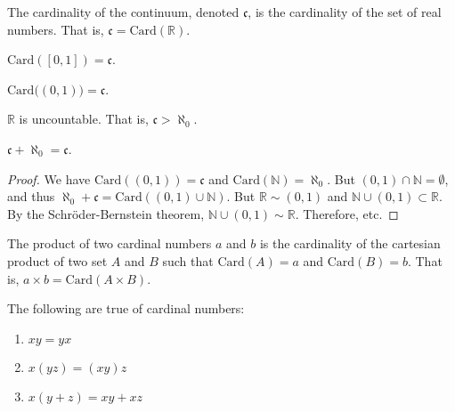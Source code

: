         \begin{definition}
            The cardinality of the continuum,
            denoted $\mathfrak{c}$, is the
            cardinality of the set of real numbers.
            That is, $\mathfrak{c}=\mathrm{Card}(\mathbb{R})$.
        \end{definition}
        \begin{theorem}
            $\mathrm{Card}([0,1])=\mathfrak{c}$.
        \end{theorem}
        \begin{theorem}
            $\mathrm{Card}\big((0,1)\big)=\mathfrak{c}$.
        \end{theorem}
        \begin{theorem}
            $\mathbb{R}$ is uncountable. That is,
            $\mathfrak{c}>\aleph_{0}$.
        \end{theorem}
        \begin{theorem}
            $\mathfrak{c}+\aleph_{0}=\mathfrak{c}$.
        \end{theorem}
        \begin{proof}
            We have $\mathrm{Card}((0,1))=\mathfrak{c}$ and
            $\mathrm{Card}(\mathbb{N})=\aleph_{0}$. But
            $(0,1)\cap\mathbb{N}=\emptyset$, and thus
            $\aleph_{0}+\mathfrak{c}%
             =\mathrm{Card}((0,1)\cup\mathbb{N})$.
            But $\mathbb{R}\sim(0,1)$ and
            $\mathbb{N}\cup(0,1)\subset\mathbb{R}$.
            By the Schr\"{o}der-Bernstein theorem,
            $\mathbb{N}\cup(0,1)\sim\mathbb{R}$.
            Therefore, etc.
        \end{proof}
        \begin{definition}
            The product of two cardinal numbers $a$ and $b$
            is the cardinality of the cartesian product
            of two set $A$ and $B$ such that
            $\mathrm{Card}(A)=a$ and $\mathrm{Card}(B)=b$. That is,
            ${a}\times{b}=\mathrm{Card}({A}\times{B})$.
        \end{definition}
        \begin{theorem}
            The following are true of cardinal numbers:
            \begin{enumerate}
                \item $xy=yx$
                \item $x(yz)=(xy)z$
                \item $x(y+z)=xy+xz$
            \end{enumerate}
        \end{theorem}
